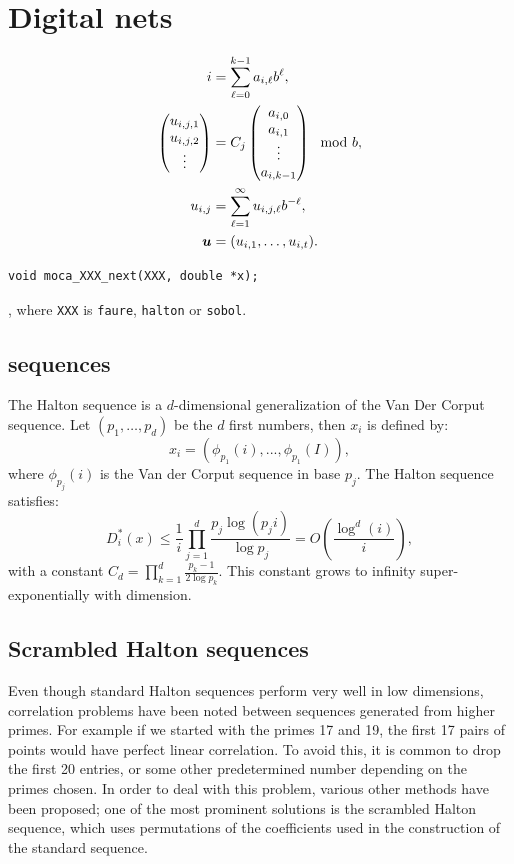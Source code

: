\section{Digital nets}

\begin{align*}
i & = \sum_{\ell = 0}^{k-1} a_{i,\ell} b^{\ell},\\
\begin{pmatrix}
u_{i,j,1} \\ u_{i,j,2} \\ \vdots
\end{pmatrix} & = C_j
\begin{pmatrix}
a_{i,0} \\ a_{i,1} \\ \vdots \\ a_{i,k-1}
\end{pmatrix} \mod b, \\
u_{i,j} & = \sum_{\ell = 1}^{\infty} u_{i,j,\ell}b^{-\ell}, \\
\boldsymbol{u} & = (u_{i,1},\ldots,u_{i,t}).
\end{align*}

\begin{verbatim}
void moca_XXX_next(XXX, double *x);
\end{verbatim},
where \verb|XXX| is \verb|faure|, \verb|halton| or \verb|sobol|.

\subsection{ sequences}

The Halton sequence is a $d$-dimensional generalization of the Van Der
Corput sequence.
Let $(p_1,\ldots,p_d)$ be the $d$ first  numbers, then $x_i$ is
defined by:
\[
x_i = (\phi_{p_1}(i),...,\phi_{p_1}(I)),
\]
where $\phi_{p_j}(i)$ is the Van der Corput sequence in base $p_j$.
The Halton sequence satisfies:
\[
D_i^*(x) \leq \frac{1}{i} \prod_{j=1}^d \frac{p_j \log(p_j i)}{\log
  p_j} = O\left( \frac{\log^d(i)}{i} \right),
\]
with a constant $C_d = \prod_{k=1}^{d} \frac{p_k-1}{2 \log p_k}$.
This constant grows to infinity super-exponentially with dimension.

\subsection{Scrambled Halton sequences}

Even though standard Halton sequences perform very well in low
dimensions, correlation problems have been noted between sequences
generated from higher primes. For example if we started with the
primes 17 and 19, the first 17 pairs of points would have perfect
linear correlation. To avoid this, it is common to drop the first 20
entries, or some other predetermined number depending on the primes
chosen. In order to deal with this problem, various other methods have
been proposed; one of the most prominent solutions is the scrambled
Halton sequence, which uses permutations of the coefficients used in
the construction of the standard sequence.

